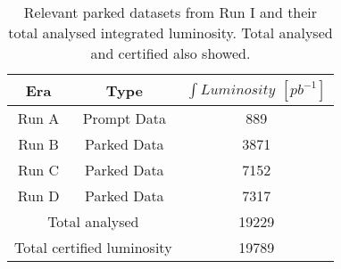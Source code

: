 \begin{table}[!htb]
\centering
\begin{tabular}{|c|c|c|}
\hline
Era & Type & $\int{Luminosity}$ $[pb^{-1}]$ \\
\hline \hline
Run A & Prompt Data &  889 \\
Run B & Parked Data & 3871 \\
Run C & Parked Data & 7152 \\
Run D & Parked Data & 7317 \\
\hline\hline
\multicolumn{2}{|c|}{Total analysed} & 19229 \\
\hline\hline
\multicolumn{2}{|c|}{Total certified luminosity} & 19789 \\
\hline
\end{tabular}
\caption{Relevant parked datasets from Run I and their total analysed integrated luminosity. Total analysed and certified also showed.}
\label{TABLE:ParkedData_Data_RunI_IntegratedLuminosity}
\end{table}
